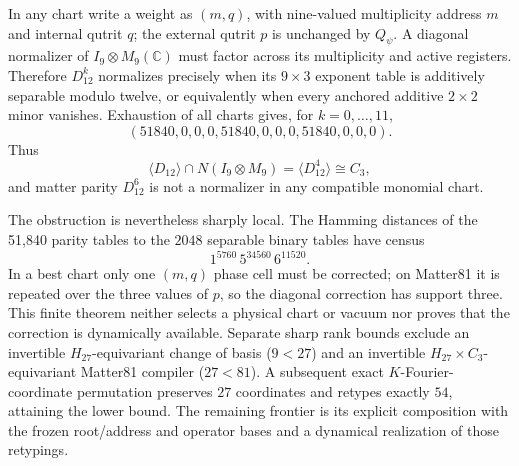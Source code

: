 In any chart write a weight as $(m,q)$, with nine-valued multiplicity address
$m$ and internal qutrit $q$; the external qutrit $p$ is unchanged by $Q_\psi$.
A diagonal normalizer of $I_9\otimes M_9(\mathbb C)$ must factor across its
multiplicity and active registers.  Therefore $D_{12}^k$ normalizes precisely
when its $9\times3$ exponent table is additively separable modulo twelve, or
equivalently when every anchored additive $2\times2$ minor vanishes.  Exhaustion
of all charts gives, for $k=0,\ldots,11$,
\[
 (51840,0,0,0,51840,0,0,0,51840,0,0,0).
\]
Thus
\[
 \boxed{\langle D_{12}\rangle\cap
 N(I_9\otimes M_9)=\langle D_{12}^{4}\rangle\cong C_3,}
\]
and matter parity $D_{12}^{6}$ is not a normalizer in any compatible monomial
chart.

The obstruction is nevertheless sharply local.  The Hamming distances of the
51,840 parity tables to the $2048$ separable binary tables have census
\[
 1^{5760}\,5^{34560}\,6^{11520}.
\]
In a best chart only one $(m,q)$ phase cell must be corrected; on Matter81 it
is repeated over the three values of $p$, so the diagonal correction has
support three.  This finite theorem neither selects a physical chart or vacuum
nor proves that the correction is dynamically available.  Separate sharp
rank bounds exclude an invertible $H_{27}$-equivariant change of basis
($9<27$) and an invertible $H_{27}\times C_3$-equivariant Matter81 compiler
($27<81$).  A subsequent exact $K$-Fourier-coordinate permutation preserves
$27$ coordinates and retypes exactly $54$, attaining the lower bound.  The
remaining frontier is its explicit composition with the frozen root/address
and operator bases and a dynamical realization of those retypings.

